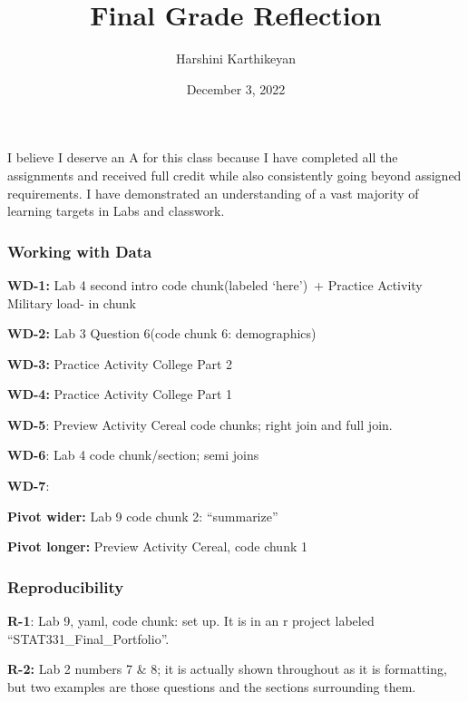 \documentclass[
  letterpaper,
  DIV=11,
  numbers=noendperiod]{scrartcl}
\title{Final Grade Reflection}
\author{Harshini Karthikeyan}
\date{December 3, 2022}
\begin{document}
\maketitle
\ifdefined\Shaded\renewenvironment{Shaded}{\begin{tcolorbox}[breakable, interior hidden, enhanced, borderline west={3pt}{0pt}{shadecolor}, sharp corners, frame hidden, boxrule=0pt]}{\end{tcolorbox}}\fi

I believe I deserve an A for this class because I have completed all the
assignments and received full credit while also consistently going
beyond assigned requirements. I have demonstrated an understanding of a
vast majority of learning targets in Labs and classwork.~

\hypertarget{working-with-data}{%
\subsubsection{Working with Data}\label{working-with-data}}

\textbf{WD-1:} Lab 4 second intro code chunk(labeled `here')~+ Practice
Activity Military load- in chunk

\textbf{WD-2:} Lab 3 Question 6(code chunk 6: demographics)

\textbf{WD-3:} Practice Activity College Part 2

\textbf{WD-4:} Practice Activity College Part 1~

\textbf{WD-5}: Preview Activity Cereal code chunks; right join and full
join.~

\textbf{WD-6}: Lab 4 code chunk/section; semi joins

\textbf{WD-7}:~

\textbf{Pivot wider:} Lab 9 code chunk 2: ``summarize''

\textbf{Pivot longer:} Preview Activity Cereal, code chunk 1

\hypertarget{reproducibility}{%
\subsubsection{Reproducibility}\label{reproducibility}}

\textbf{R-1}: Lab 9, yaml, code chunk: set up. It is in an r project
labeled ``STAT331\_Final\_Portfolio''.

\textbf{R-2:} Lab 2 numbers 7 \& 8; it is actually shown throughout as
it is formatting, but two examples are those questions and the sections
surrounding them.~
\end{document}
